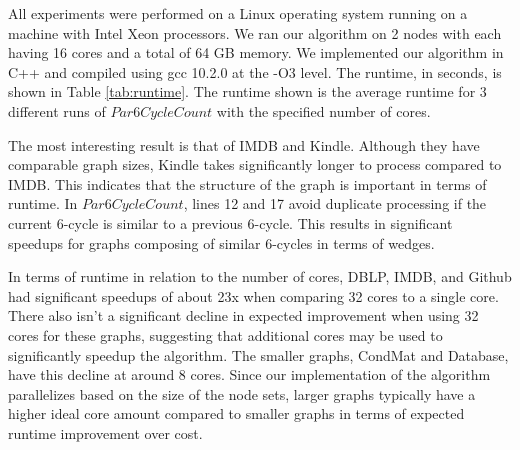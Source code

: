 \documentclass[11pt]{article}
\begin{document}
\begin{table}[h]
  \caption{Runtime (seconds)}
  \label{tab:runtime}
  \centering
\end{table}

All experiments were performed on a Linux operating system running on a machine with Intel Xeon processors.
We ran our algorithm on 2 nodes with each having 16 cores and a total of 64 GB memory.
We implemented our algorithm in C++ and compiled using gcc 10.2.0 at the -O3 level.
The runtime, in seconds, is shown in Table \ref{tab:runtime}.
The runtime shown is the average runtime for 3 different runs of $Par6CycleCount$ with the specified number of cores.

The most interesting result is that of IMDB and Kindle.
Although they have comparable graph sizes, Kindle takes significantly longer to process compared to IMDB.
This indicates that the structure of the graph is important in terms of runtime.
In $Par6CycleCount$, lines 12 and 17 avoid duplicate processing if the current 6-cycle is similar to a previous 6-cycle.
This results in significant speedups for graphs composing of similar 6-cycles in terms of wedges.

In terms of runtime in relation to the number of cores, DBLP, IMDB, and Github had significant speedups of about 23x when comparing 32 cores to a single core.
There also isn't a significant decline in expected improvement when using 32 cores for these graphs, suggesting that additional cores may be used to significantly speedup the algorithm.
The smaller graphs, CondMat and Database, have this decline at around 8 cores.
Since our implementation of the algorithm parallelizes based on the size of the node sets, larger graphs typically have a higher ideal core amount compared to smaller graphs in terms of expected runtime improvement over cost.
\end{document}
